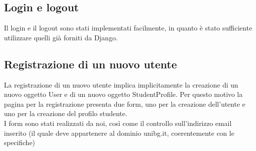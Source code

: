 \documentclass[10pt,a4paper]{report}
\begin{document}
	\subsection{Login e logout}
	Il login e il logout sono stati implementati facilmente, in quanto è stato sufficiente utilizzare quelli già forniti da Django.
	
	\subsection{Registrazione di un nuovo utente}
	La registrazione di un nuovo utente implica implicitamente la creazione di un nuovo oggetto User e di un nuovo oggetto StudentProfile. Per questo motivo la pagina per la registrazione presenta due form, uno per la creazione dell'utente e uno per la creazione del profilo studente. \\
	I form sono stati realizzati da noi, così come il controllo sull'indirizzo email inserito (il quale deve appartenere al dominio unibg.it, coerentemente con le specifiche)
	
	
\end{document}
